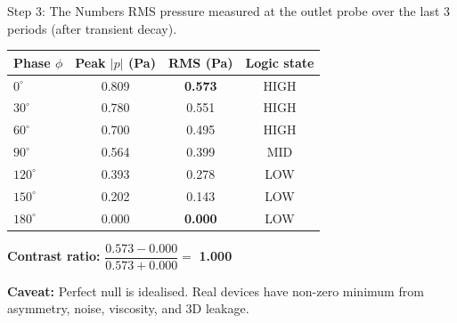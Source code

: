\documentclass[aspectratio=169,11pt]{beamer}
\begin{document}
\begin{frame}{Step 3: The Numbers}
  RMS pressure measured at the outlet probe over the last 3 periods (after transient decay).

  \vspace{0.2cm}
  \begin{table}
    \centering
    \footnotesize
    \renewcommand{\arraystretch}{1.05}
    \begin{tabular}{@{}lccc@{}}
      \toprule
      \textbf{Phase $\phi$} & \textbf{Peak $|p|$ (Pa)} & \textbf{RMS (Pa)} & \textbf{Logic state} \\
      \midrule
      $0^\circ$ & 0.809 & \textbf{0.573} & HIGH \\
      $30^\circ$ & 0.780 & 0.551 & HIGH \\
      $60^\circ$ & 0.700 & 0.495 & HIGH \\
      $90^\circ$ & 0.564 & 0.399 & MID \\
      $120^\circ$ & 0.393 & 0.278 & LOW \\
      $150^\circ$ & 0.202 & 0.143 & LOW \\
      $180^\circ$ & 0.000 & \textbf{0.000} & LOW \\
      \bottomrule
    \end{tabular}
  \end{table}

  \vspace{0.1cm}
  \textbf{Contrast ratio:} $\dfrac{0.573 - 0.000}{0.573 + 0.000} =$ \textbf{1.000}

  \vspace{0.1cm}
  \textcolor{gdpBurgundy}{\small \textbf{Caveat:} Perfect null is idealised. Real devices have non-zero minimum from asymmetry, noise, viscosity, and 3D leakage.}
\end{frame}
\end{document}

